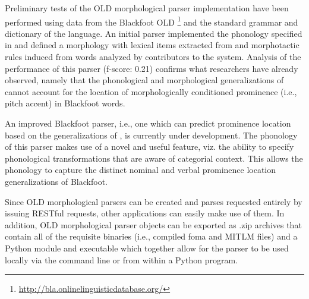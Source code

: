 \documentclass[11pt]{article}
\begin{document}
Preliminary tests of the OLD morphological parser implementation have been
performed using data from the Blackfoot OLD%
\footnote{\url{http://bla.onlinelinguisticdatabase.org/}} %
and the standard grammar \cite{frantz91} and dictionary \cite{frantz95} of the
language. An initial parser implemented the phonology specified in
\cite{frantz91} and defined a morphology with lexical items extracted from
\cite{frantz95} and morphotactic rules induced from words analyzed by
contributors to the system. Analysis of the performance of this parser
(f-score: 0.21) confirms what researchers \cite{weber2013} have already
observed, namely that the phonological and morphological generalizations of
\cite{frantz91} cannot account for the location of morphologically conditioned
prominence (i.e., pitch accent) in Blackfoot words.

An improved Blackfoot parser, i.e., one which can predict prominence location
based on the generalizations of \cite{weber2013}, is currently under
development. The phonology of this parser makes use of a novel and useful
feature, viz. the ability to specify phonological transformations that are
aware of categorial context. This allows the phonology to capture the distinct
nominal and verbal prominence location generalizations of Blackfoot.

Since OLD morphological parsers can be created and parses requested entirely by
issuing RESTful requests, other applications can easily make use of them. In
addition, OLD morphological parser objects can be exported as .zip archives
that contain all of the requisite binaries (i.e., compiled foma and MITLM
files) and a Python module and executable which together allow for the parser
to be used locally via the command line or from within a Python program.
\end{document}
